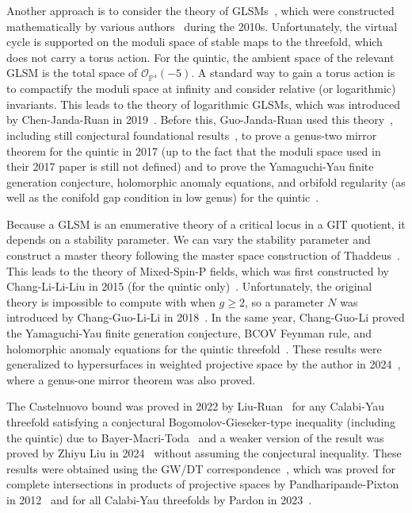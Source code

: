 \documentclass[10pt,oldfontcommands,oneside]{memoir}
\theoremstyle{definition}
\theoremstyle{remark}
\theoremstyle{plain}
\theoremstyle{definition}
\theoremstyle{remark}
\renewcommand{\P}{\mathbb{P}}
\newcommand{\mc}[1]{\mathcal{#1}}
\newcommand{\1}{\mathbf{1}}
\newcommand{\2}{\mathbf{2}}
\newcommand{\3}{\mathbf{3}}
\begin{document}
Another approach is to consider the theory of GLSMs~\cite{mirrorandglsm}, which were constructed mathematically by various authors~\cite{glsm,faverokim} during the 2010s. Unfortunately, the virtual cycle is supported on the moduli space of stable maps to the threefold, which does not carry a torus action.
For the quintic, the ambient space of the relevant GLSM is the total space of $\mc{O}_{\P^4}(-5)$. A standard way to gain a torus action is to compactify the moduli space at infinity and consider relative (or logarithmic) invariants. This leads to the theory of logarithmic GLSMs, which was introduced by Chen-Janda-Ruan in 2019~\cite{logglsm}. Before this, Guo-Janda-Ruan used this theory~\cite{puncturedlogr}, including still conjectural foundational results~\cite{structurelog1,structurelog3}, to prove a genus-two mirror theorem for the quintic in 2017 (up to the fact that the moduli space used in their 2017 paper is still not defined) and to prove the Yamaguchi-Yau finite generation conjecture, holomorphic anomaly equations, and orbifold regularity (as well as the conifold gap condition in low genus) for the quintic~\cite{genus2logglsm,bcovlogglsm}.

Because a GLSM is an enumerative theory of a critical locus in a GIT quotient, it depends on a stability parameter. We can vary the stability parameter and construct a master theory following the master space construction of Thaddeus~\cite{gitflips}. This leads to the theory of Mixed-Spin-P fields, which was first constructed by Chang-Li-Li-Liu in 2015 (for the quintic only)~\cite{mspfermat,msp2}. Unfortunately, the original theory is impossible to compute with when $g \geq 2$, so a parameter $N$ was introduced by Chang-Guo-Li-Li in 2018~\cite{nmsp}. In the same year, Chang-Guo-Li proved the Yamaguchi-Yau finite generation conjecture, BCOV Feynman rule, and holomorphic anomaly equations for the quintic threefold~\cite{nmsp2,nmsp3}. These results were generalized to hypersurfaces in weighted projective space by the author in 2024~\cite{polynomiality,bcovme}, where a genus-one mirror theorem was also proved.

The Castelnuovo bound was proved in 2022 by Liu-Ruan~\cite{castelnuovoquintic} for any Calabi-Yau threefold satisfying a conjectural Bogomolov-Gieseker-type inequality (including the quintic) due to Bayer-Macri-Toda~\cite{bmt} and a weaker version of the result was proved by Zhiyu Liu in 2024~\cite{castelnuovogeneral} without assuming the conjectural inequality. These results were obtained using the GW/DT correspondence~\cite{mnop1,mnop2}, which was proved for complete intersections in products of projective spaces by Pandharipande-Pixton in 2012~\cite{ppquintic} and for all Calabi-Yau threefolds by Pardon in 2023~\cite{universalcount}.
\end{document}
